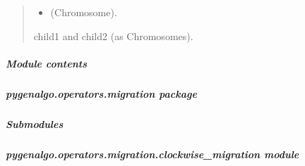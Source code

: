 \documentclass[letterpaper,10pt,english]{sphinxmanual}
\begin{document}
\begin{fulllineitems}
\begin{fulllineitems}
\begin{quote}
\begin{description}
\begin{itemize}
\item {} 
\sphinxAtStartPar
{} \textendash{} (Chromosome).

\end{itemize}

\sphinxAtStartPar
child1 and child2 (as Chromosomes).

\end{description}\end{quote}

\end{fulllineitems}


\end{fulllineitems}



\subparagraph{Module contents}
\label{\detokenize{pygenalgo.operators.crossover:module-pygenalgo.operators.crossover}}\label{\detokenize{pygenalgo.operators.crossover:module-contents}}
\sphinxstepscope


\subparagraph{pygenalgo.operators.migration package}
\label{\detokenize{pygenalgo.operators.migration:pygenalgo-operators-migration-package}}\label{\detokenize{pygenalgo.operators.migration::doc}}

\subparagraph{Submodules}
\label{\detokenize{pygenalgo.operators.migration:submodules}}

\subparagraph{pygenalgo.operators.migration.clockwise\_migration module}
\label{\detokenize{pygenalgo.operators.migration:module-pygenalgo.operators.migration.clockwise_migration}}\label{\detokenize{pygenalgo.operators.migration:pygenalgo-operators-migration-clockwise-migration-module}}
\end{document}
